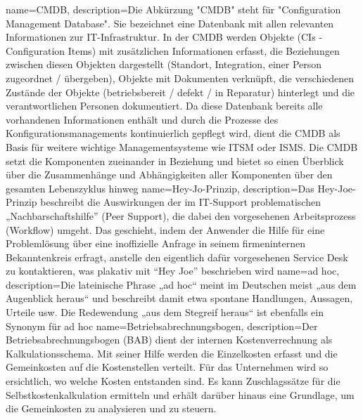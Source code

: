 {
	name=CMDB,
	description={Die Abkürzung "CMDB" steht für "Configuration Management Database". Sie bezeichnet eine Datenbank mit allen relevanten Informationen zur IT-Infrastruktur. In der CMDB werden Objekte (CIs - Configuration Items) mit zusätzlichen Informationen erfasst, die Beziehungen zwischen diesen Objekten dargestellt (Standort, Integration, einer Person zugeordnet / übergeben), Objekte mit Dokumenten verknüpft, die verschiedenen Zustände der Objekte (betriebsbereit / defekt / in Reparatur) hinterlegt und die verantwortlichen Personen dokumentiert. Da diese Datenbank bereits alle vorhandenen Informationen enthält und durch die  Prozesse des Konfigurationsmanagements kontinuierlich gepflegt wird, dient die CMDB als Basis für weitere wichtige Managementsysteme wie ITSM oder ISMS. Die CMDB setzt die Komponenten zueinander in Beziehung und bietet so einen Überblick über die Zusammenhänge und Abhängigkeiten aller Komponenten über den gesamten Lebenszyklus hinweg}
}
{
	name=Hey-Jo-Prinzip,
	description={Das Hey-Joe-Prinzip beschreibt die Auswirkungen der im IT-Support problematischen „Nachbarschaftshilfe” (Peer Support), die dabei den vorgesehenen Arbeitsprozess (Workflow) umgeht. Das geschieht, indem der Anwender die Hilfe für eine Problemlösung über eine inoffizielle Anfrage in seinem firmeninternen Bekanntenkreis erfragt, anstelle den eigentlich dafür vorgesehenen Service Desk zu kontaktieren, was plakativ mit “Hey Joe” beschrieben wird}
}
{
	name={ad hoc},
	description={Die lateinische Phrase „ad hoc“ meint im Deutschen meist „aus dem Augenblick heraus“ und beschreibt damit etwa spontane Handlungen, Aussagen, Urteile usw. Die Redewendung „aus dem Stegreif heraus“ ist ebenfalls ein Synonym für ad hoc}
}
{
	name={Betriebsabrechnungsbogen},
	description={Der Betriebsabrechnungsbogen (BAB) dient der internen Kostenverrechnung als Kalkulationsschema. Mit seiner Hilfe werden die Einzelkosten erfasst und die Gemeinkosten auf die Kostenstellen verteilt. Für das Unternehmen wird so ersichtlich, wo welche Kosten entstanden sind. Es kann Zuschlagssätze für die Selbstkostenkalkulation ermitteln und erhält darüber hinaus eine Grundlage, um die Gemeinkosten zu analysieren und zu steuern.}
}